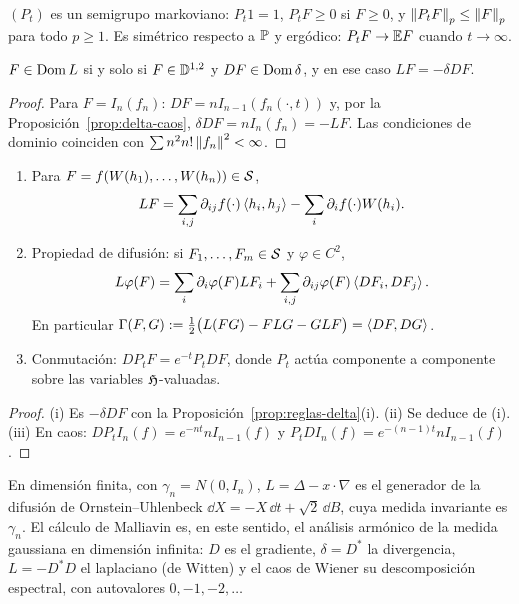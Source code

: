 \begin{corolario}
$(P_t)$ es un semigrupo markoviano: $P_t1=1$, $P_tF\ge0$ si $F\ge0$, y $\norm{P_tF}_p\le\norm{F}_p$
para todo $p\ge1$. Es simétrico respecto a $\P$ y ergódico: $P_tF\to\E F$ cuando $t\to\infty$.
\end{corolario}

\begin{proposicion}
$F\in\Dom L$ si y solo si $F\in\D^{1,2}$ y $DF\in\Dom\delta$, y en ese caso $LF=-\delta DF$.
\end{proposicion}

\begin{proof}
Para $F=I_n(f_n)$: $DF=nI_{n-1}(f_n(\cdot,t))$ y, por la Proposición~\ref{prop:delta-caos}, $\delta DF=
nI_n(f_n)=-LF$. Las condiciones de dominio coinciden con $\sum n^2n!\norm{f_n}^2<\infty$.
\end{proof}

\begin{proposicion}
\begin{enumerate}[label=(\roman*)]
  \item Para $F=f(W(h_1),\dots,W(h_n))\in\Sc$,
  \[
    LF=\sum_{i,j}\partial_{ij}f(\cdot)\ip{h_i}{h_j}-\sum_i\partial_if(\cdot)W(h_i).
  \]
  \item \textup{Propiedad de difusión}: si $F_1,\dots,F_m\in\Sc$ y $\varphi\in C^2$,
  \[
    L\varphi(F)=\sum_i\partial_i\varphi(F)LF_i+\sum_{i,j}\partial_{ij}\varphi(F)\ip{DF_i}{DF_j}.
  \]
  En particular $\Gamma(F,G):=\frac12\big(L(FG)-FLG-GLF\big)=\ip{DF}{DG}$.
  \item \textup{Conmutación}: $DP_tF=e^{-t}P_tDF$, donde $P_t$ actúa componente a componente sobre las
  variables $\Hf$-valuadas.
\end{enumerate}
\end{proposicion}

\begin{proof}
(i) Es $-\delta DF$ con la Proposición~\ref{prop:reglas-delta}(i). (ii) Se deduce de (i). (iii) En caos:
$DP_tI_n(f)=e^{-nt}nI_{n-1}(f)$ y $P_tDI_n(f)=e^{-(n-1)t}nI_{n-1}(f)$.
\end{proof}

\begin{intuicion}
En dimensión finita, con $\gamma_n=N(0,I_n)$, $L=\Delta-x\cdot\nabla$ es el generador de la difusión de
Ornstein--Uhlenbeck $\dd X=-X\,\dd t+\sqrt2\,\dd B$, cuya medida invariante es $\gamma_n$. El cálculo de
Malliavin es, en este sentido, el análisis armónico de la medida gaussiana en dimensión
infinita: $D$ es el gradiente, $\delta=D^*$ la divergencia, $L=-D^*D$ el laplaciano (de Witten) y
el caos de Wiener su descomposición espectral, con autovalores $0,-1,-2,\dots$
\end{intuicion}

